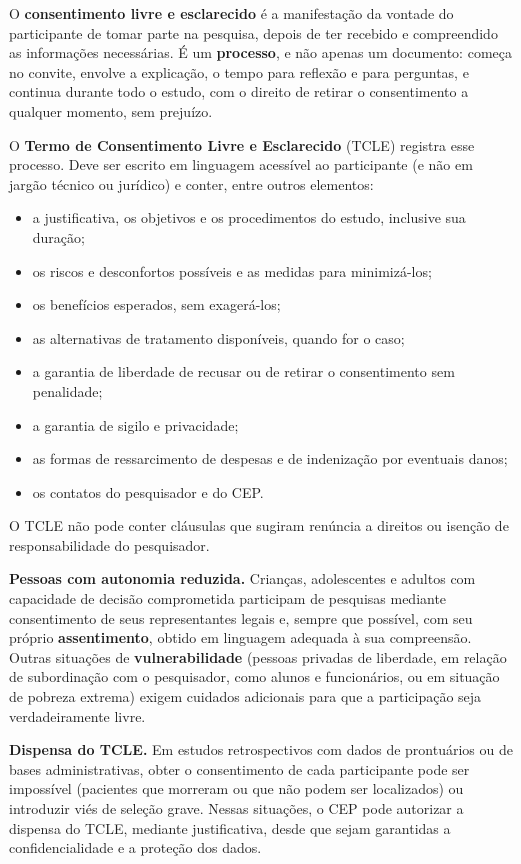 \documentclass[
]{book}
\providecommand{\tightlist}{%
  \setlength{\itemsep}{0pt}\setlength{\parskip}{0pt}}
\begin{document}
O \textbf{consentimento livre e esclarecido} é a manifestação da vontade do participante de tomar parte na pesquisa, depois de ter recebido e compreendido as informações necessárias. É um \textbf{processo}, e não apenas um documento: começa no convite, envolve a explicação, o tempo para reflexão e para perguntas, e continua durante todo o estudo, com o direito de retirar o consentimento a qualquer momento, sem prejuízo.

O \textbf{Termo de Consentimento Livre e Esclarecido} (TCLE) registra esse processo. Deve ser escrito em linguagem acessível ao participante (e não em jargão técnico ou jurídico) e conter, entre outros elementos:

\begin{itemize}
\tightlist
\item
  a justificativa, os objetivos e os procedimentos do estudo, inclusive sua duração;
\item
  os riscos e desconfortos possíveis e as medidas para minimizá-los;
\item
  os benefícios esperados, sem exagerá-los;
\item
  as alternativas de tratamento disponíveis, quando for o caso;
\item
  a garantia de liberdade de recusar ou de retirar o consentimento sem penalidade;
\item
  a garantia de sigilo e privacidade;
\item
  as formas de ressarcimento de despesas e de indenização por eventuais danos;
\item
  os contatos do pesquisador e do CEP.
\end{itemize}

O TCLE não pode conter cláusulas que sugiram renúncia a direitos ou isenção de responsabilidade do pesquisador.

\textbf{Pessoas com autonomia reduzida.} Crianças, adolescentes e adultos com capacidade de decisão comprometida participam de pesquisas mediante consentimento de seus representantes legais e, sempre que possível, com seu próprio \textbf{assentimento}, obtido em linguagem adequada à sua compreensão. Outras situações de \textbf{vulnerabilidade} (pessoas privadas de liberdade, em relação de subordinação com o pesquisador, como alunos e funcionários, ou em situação de pobreza extrema) exigem cuidados adicionais para que a participação seja verdadeiramente livre.

\textbf{Dispensa do TCLE.} Em estudos retrospectivos com dados de prontuários ou de bases administrativas, obter o consentimento de cada participante pode ser impossível (pacientes que morreram ou que não podem ser localizados) ou introduzir viés de seleção grave. Nessas situações, o CEP pode autorizar a dispensa do TCLE, mediante justificativa, desde que sejam garantidas a confidencialidade e a proteção dos dados.
\end{document}
